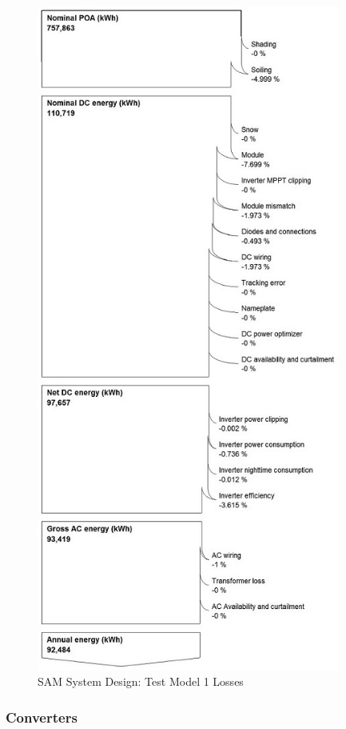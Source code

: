 \begin{figure}[H]
\hfill\includegraphics[width = 100mm]{images/sam-1-system-losses}\hspace*{\fill}
\caption{SAM System Design: Test Model 1 Losses} 
\label{fig:SAM-Model-2}
\end{figure}


\subsubsection{Converters}

